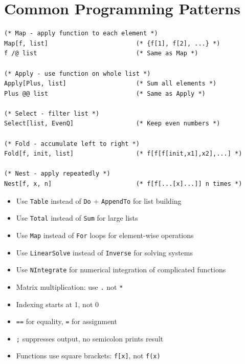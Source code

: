 \documentclass[12pt,a4paper]{article}
\begin{document}
\section{Common Programming Patterns}

\begin{commandbox}
\begin{lstlisting}
(* Map - apply function to each element *)
Map[f, list]                        (* {f[1], f[2], ...} *)
f /@ list                           (* Same as Map *)

(* Apply - use function on whole list *)
Apply[Plus, list]                   (* Sum all elements *)
Plus @@ list                        (* Same as Apply *)

(* Select - filter list *)
Select[list, EvenQ]                 (* Keep even numbers *)

(* Fold - accumulate left to right *)
Fold[f, init, list]                 (* f[f[f[init,x1],x2],...] *)

(* Nest - apply repeatedly *)
Nest[f, x, n]                       (* f[f[...[x]...]] n times *)
\end{lstlisting}
\end{commandbox}

\begin{tipbox}
\begin{itemize}
    \item Use \texttt{Table} instead of \texttt{Do} + \texttt{AppendTo} for list building
    \item Use \texttt{Total} instead of \texttt{Sum} for large lists
    \item Use \texttt{Map} instead of \texttt{For} loops for element-wise operations
    \item Use \texttt{LinearSolve} instead of \texttt{Inverse} for solving systems
    \item Use \texttt{NIntegrate} for numerical integration of complicated functions
\end{itemize}
\end{tipbox}

\begin{warningbox}
\begin{itemize}
    \item Matrix multiplication: use \texttt{.} not \texttt{*}
    \item Indexing starts at 1, not 0
    \item \texttt{==} for equality, \texttt{=} for assignment
    \item \texttt{;} suppresses output, no semicolon prints result
    \item Functions use square brackets: \texttt{f[x]}, not \texttt{f(x)}
\end{itemize}
\end{warningbox}

\end{document}
